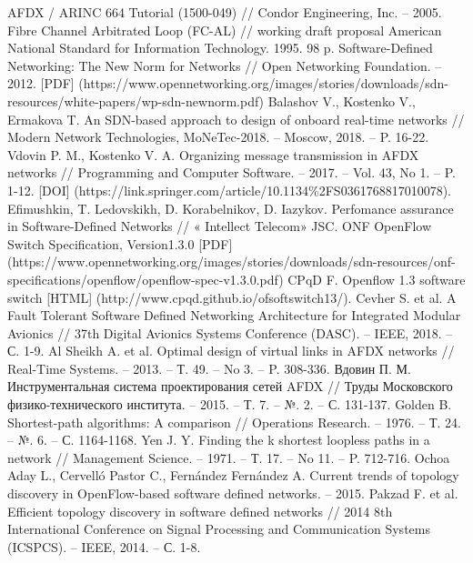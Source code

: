 \documentclass[12pt, a4paper]{article}
\begin{document}
\renewcommand{\bibname}{Список литературы}
\addcontentsline{toc}{section}{\bibname}

\begin{thebibliography}{}
	AFDX / ARINC 664 Tutorial (1500-049) // Condor Engineering, Inc. -- 2005.
	Fibre Channel Arbitrated Loop (FC-AL) // working draft proposal American National Standard for Information Technology. 1995. 98 p.
	Software-Defined Networking: The New Norm for Networks // Open Networking Foundation. -- 2012. [PDF] (https://www.opennetworking.org/images/stories/downloads/sdn-resources/white-papers/wp-sdn-newnorm.pdf)
	Balashov V., Kostenko V., Ermakova T. An SDN-based approach to design of onboard real-time networks // Modern Network Technologies, MoNeTec-2018. -- Moscow, 2018. -- P. 16-22.
	Vdovin P. M., Kostenko V. A. Organizing message transmission in AFDX networks // Programming and Computer Software. -- 2017. -- Vol. 43, No 1. -- P. 1-12. [DOI] (https://link.springer.com/article/10.1134\%2FS0361768817010078).
	Efimushkin, T. Ledovskikh, D. Korabelnikov, D. Iazykov. Perfomance assurance in Software-Defined Networks // « Intellect Telecom» JSC.
	ONF OpenFlow Switch Specification, Version1.3.0 [PDF] (https://www.opennetworking.org/images/stories/downloads/sdn-resources/onf-specifications/openflow/openflow-spec-v1.3.0.pdf)
	CPqD F. Openflow 1.3 software switch [HTML] (http://www.cpqd.github.io/ofsoftswitch13/).
	Cevher S. et al. A Fault Tolerant Software Defined Networking Architecture for Integrated Modular Avionics // 37th Digital Avionics Systems Conference (DASC). -- IEEE, 2018. -- С. 1-9.
	Al Sheikh A. et al. Optimal design of virtual links in AFDX networks // Real-Time Systems. -- 2013. -- Т. 49. -- No 3. -- P. 308-336.
	Вдовин П. М. Инструментальная система проектирования сетей AFDX // Труды Московского физико-технического института. -- 2015. -- Т. 7. -- №. 2. -- С. 131-137.
	Golden B. Shortest-path algorithms: A comparison // Operations Research. -- 1976. -- Т. 24. -- №. 6. -- С. 1164-1168.
	Yen J. Y. Finding the k shortest loopless paths in a network // Management Science. -- 1971. -- Т. 17. -- No 11. -- P. 712-716.
	Ochoa Aday L., Cervelló Pastor C., Fernández Fernández A. Current trends of topology discovery in OpenFlow-based software defined networks. -- 2015.
	Pakzad F. et al. Efficient topology discovery in software defined networks // 2014 8th International Conference on Signal Processing and Communication Systems (ICSPCS). -- IEEE, 2014. -- С. 1-8.

\end{thebibliography}
\end{document}

